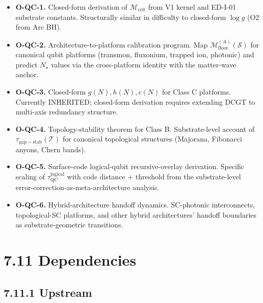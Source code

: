 \documentclass[11pt]{book}
\begin{document}
\begin{itemize}
\item \textbf{O-QC-1.} Closed-form derivation of $\mathcal{M}_\mathrm{crit}$ from V1 kernel and ED-I-01 substrate constants. Structurally similar in difficulty to closed-form $\log g$ (O2 from Arc BH).
\item \textbf{O-QC-2.} Architecture-to-platform calibration program. Map $\mathcal{M}_\mathrm{floor}^{(A)}(\mathcal{S})$ for canonical qubit platforms (transmon, fluxonium, trapped ion, photonic) and predict $N_\star$ values via the cross-platform identity with the matter-wave anchor.
\item \textbf{O-QC-3.} Closed-form $g(N), h(N), c(N)$ for Class C platforms. Currently INHERITED; closed-form derivation requires extending DCGT to multi-axis redundancy structure.
\item \textbf{O-QC-4.} Topology-stability theorem for Class B. Substrate-level account of $\tau_\mathrm{gap-stab}(\mathcal{T})$ for canonical topological structures (Majorana, Fibonacci anyons, Chern bands).
\item \textbf{O-QC-5.} Surface-code logical-qubit recursive-overlay derivation. Specific scaling of $\tau_\mathrm{QC}^\mathrm{logical}$ with code distance + threshold from the substrate-level error-correction-as-meta-architecture analysis.
\item \textbf{O-QC-6.} Hybrid-architecture handoff dynamics. SC-photonic interconnects, topological-SC platforms, and other hybrid architectures' handoff boundaries as substrate-geometric transitions.
\end{itemize}

\section{7.11 Dependencies}

\subsection{7.11.1 Upstream}
\end{document}
